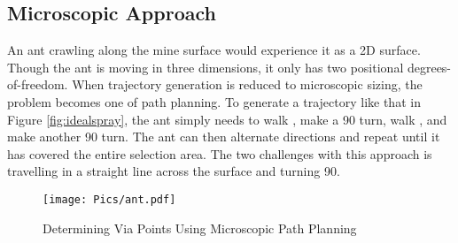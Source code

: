 \subsection{Microscopic Approach}

An ant crawling along the mine surface would experience it as a 2D surface. Though the ant is moving in three dimensions, it only has two positional degrees-of-freedom. When trajectory generation is reduced to microscopic sizing, the problem becomes one of path planning. To generate a trajectory like that in Figure \ref{fig:idealspray}, the ant simply needs to walk , make a 90\degree\hspace{0pt} turn, walk , and make another 90\degree\hspace{0pt} turn. The ant can then alternate directions and repeat until it has covered the entire selection area. The two challenges with this approach is travelling in a straight line across the surface and turning 90\degree\hspace{0pt}.\\

\begin{figure}[h!]
    \centering
    \texttt{[image: Pics/ant.pdf]}
    \caption{Determining Via Points Using Microscopic Path Planning}
    \label{fig:ant}
\end{figure}

